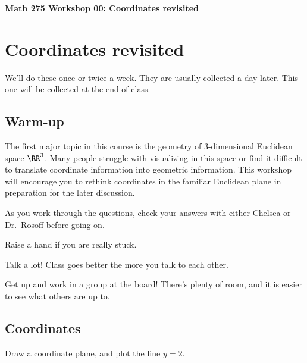 \documentclass[12pt]{exam}
\begin{document}
\noindent
\textbf{{\large Math 275 \hfill Workshop 00: Coordinates revisited}}

\noindent
{}

\noindent
{} 

\section{Coordinates revisited}

We'll do these once or twice a week. They are usually collected a
day later. This one will be collected at the end of class.

\subsection{Warm-up}

The first major topic in this course is the geometry of 3-dimensional
Euclidean space $\RR^3$. Many people struggle with visualizing in
this space or find it difficult to translate coordinate information into
geometric information. This workshop will encourage you to rethink
coordinates in the familiar Euclidean plane in preparation for the later
discussion.

\begin{compactitem}
    \item As you work through the questions, check your answers with either Chelsea or Dr.\ Rosoff before going on. 
    \item Raise a hand if you are really stuck. 
    \item Talk a lot! Class goes better the more you talk to each other.
    \item Get up and work in a group at the board! There's plenty of room, 
    and it is easier to see what others are up to.
\end{compactitem}

\subsection{Coordinates}

Draw a coordinate plane, and plot the line $y = 2$.
\end{document}
